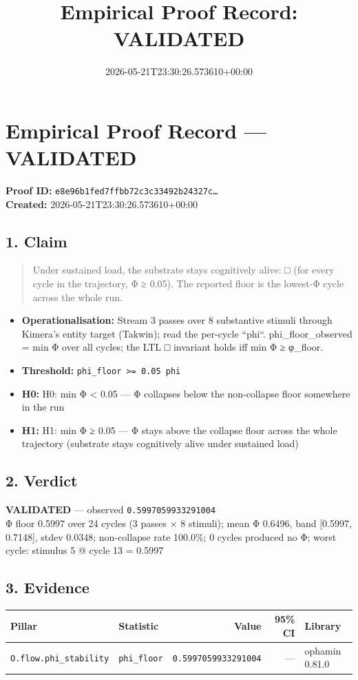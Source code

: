 \documentclass{article}
\title{Empirical Proof Record: VALIDATED}
\date{2026-05-21T23:30:26.573610+00:00}
\begin{document}
\maketitle
\section*{Empirical Proof Record --- \textcolor{validated}{\textbf{VALIDATED}}}
\textbf{Proof ID:} \texttt{e8e96b1fed7ffbb72c3c33492b24327c\dots}\\
\textbf{Created:} 2026-05-21T23:30:26.573610+00:00
\subsection*{1. Claim}
\begin{quote}Under sustained load, the substrate stays cognitively alive: □ (for every cycle in the trajectory, Φ ≥ 0.05). The reported floor is the lowest-Φ cycle across the whole run.\end{quote}
\begin{itemize}
\item \textbf{Operationalisation:} Stream 3 passes over 8 substantive stimuli through Kimera's entity target (Takwin); read the per-cycle ``phi``. phi\_floor\_observed = min Φ over all cycles; the LTL □ invariant holds iff min Φ ≥ φ\_floor.
\item \textbf{Threshold:} \texttt{phi\_floor >= 0.05 phi}
\item \textbf{H0:} H0: min Φ < 0.05 — Φ collapses below the non-collapse floor somewhere in the run
\item \textbf{H1:} H1: min Φ ≥ 0.05 — Φ stays above the collapse floor across the whole trajectory (substrate stays cognitively alive under sustained load)
\end{itemize}
\subsection*{2. Verdict}
\textcolor{validated}{\textbf{VALIDATED}} --- observed \texttt{0.5997059933291004}\\
Φ floor 0.5997 over 24 cycles (3 passes × 8 stimuli); mean Φ 0.6496, band [0.5997, 0.7148], stdev 0.0348; non-collapse rate 100.0\%; 0 cycles produced no Φ; worst cycle: stimulus 5 @ cycle 13 = 0.5997
\subsection*{3. Evidence}
\begin{tabular}{llrrl}\toprule
\textbf{Pillar} & \textbf{Statistic} & \textbf{Value} & \textbf{95\% CI} & \textbf{Library} \\\midrule
\texttt{O.flow.phi\_stability} & \texttt{phi\_floor} & \texttt{0.5997059933291004} & --- & ophamin 0.81.0 \\
\bottomrule\end{tabular}
\end{document}
